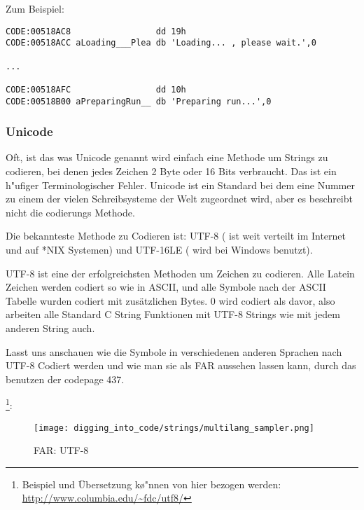 Zum Beispiel:

\begin{lstlisting}[caption=Delphi,style=customasmx86]
CODE:00518AC8                 dd 19h
CODE:00518ACC aLoading___Plea db 'Loading... , please wait.',0

...

CODE:00518AFC                 dd 10h
CODE:00518B00 aPreparingRun__ db 'Preparing run...',0
\end{lstlisting}

\subsubsection{Unicode}


Oft, ist das was Unicode genannt wird einfach eine Methode um Strings zu codieren, bei denen jedes Zeichen 2 Byte oder 
16 Bits verbraucht. Das ist ein h\a"ufiger Terminologischer Fehler. Unicode ist ein Standard bei dem eine Nummer 
zu einem der vielen Schreibsysteme der Welt zugeordnet wird, aber es beschreibt nicht die codierungs Methode. 


Die bekannteste Methode zu Codieren ist: UTF-8 ( ist weit verteilt im Internet und auf *NIX Systemen) und UTF-16LE ( wird bei Windows benutzt). 


UTF-8 ist eine der erfolgreichsten Methoden um Zeichen zu codieren.
Alle Latein Zeichen werden codiert so wie in ASCII, und alle Symbole nach der
ASCII Tabelle wurden codiert mit zus\"atzlichen Bytes. 0 wird codiert als davor,
also arbeiten alle Standard C String Funktionen mit UTF-8 Strings wie mit jedem anderen String auch.

Lasst uns anschauen wie die Symbole in verschiedenen anderen Sprachen nach UTF-8 Codiert werden und 
wie man sie als FAR aussehen lassen kann, durch das benutzen der codepage 437.

\footnote{Beispiel und \"Ubersetzung k\o"nnen von hier bezogen werden:  
\url{http://www.columbia.edu/~fdc/utf8/}}:

\begin{figure}[H]
\centering
\texttt{[image: digging\_into\_code/strings/multilang\_sampler.png]}
\end{figure}

\begin{figure}[H]
\centering
{}
\caption{FAR: UTF-8}
\end{figure}

